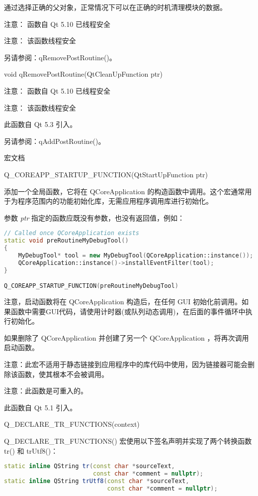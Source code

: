 通过选择正确的父对象，正常情况下可以在正确的时机清理模块的数据。

注意： 函数自 Qt 5.10 已线程安全

注意： 该函数线程安全

另请参阅：qRemovePostRoutine()。

void qRemovePostRoutine(QtCleanUpFunction ptr)

注意： 函数自 Qt 5.10 已线程安全

注意： 该函数线程安全

此函数自 Qt 5.3 引入。

另请参阅：qAddPostRoutine()。

\splitLine

宏文档

Q\_COREAPP\_STARTUP\_FUNCTION(QtStartUpFunction ptr)

添加一个全局函数，它将在 QCoreApplication 的构造函数中调用。这个宏通常用于为程序范围内的功能初始化库，无需应用程序调用库进行初始化。

参数 \emph{ptr} 指定的函数应既没有参数，也没有返回值，例如：


\begin{lstlisting}[language=C++]
// Called once QCoreApplication exists
static void preRoutineMyDebugTool()
{
    MyDebugTool* tool = new MyDebugTool(QCoreApplication::instance());
    QCoreApplication::instance()->installEventFilter(tool);
}

Q_COREAPP_STARTUP_FUNCTION(preRoutineMyDebugTool)
\end{lstlisting}

注意，启动函数将在 QCoreApplication 构造后，在任何 GUI 初始化前调用。如果函数中需要GUI代码，请使用计时器(或队列动态调用)，在后面的事件循环中执行初始化。

如果删除了 QCoreApplication 并创建了另一个 QCoreApplication ，将再次调用启动函数。

注意：此宏不适用于静态链接到应用程序中的库代码中使用，因为链接器可能会删除该函数，使其根本不会被调用。

注意：此函数是可重入的。

此函数自 Qt 5.1 引入。

\splitLine

Q\_DECLARE\_TR\_FUNCTIONS(context)

Q\_DECLARE\_TR\_FUNCTIONS() 宏使用以下签名声明并实现了两个转换函数 tr() 和 trUtf8()：

\begin{lstlisting}[language=C++]
static inline QString tr(const char *sourceText,
                         const char *comment = nullptr);
static inline QString trUtf8(const char *sourceText,
                             const char *comment = nullptr);
\end{lstlisting}


